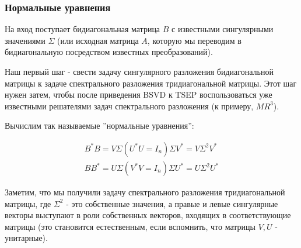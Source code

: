 

\subsubsection{Нормальные уравнения}
На вход поступает бидиагональная матрица $B$ с известными сингулярными значениями $\Sigma$ (или исходная матрица $A$, которую мы переводим в бидиагональную посредством известных преобразований).

Наш первый шаг - свести задачу сингулярного разложения бидиагональной матрицы к задаче спектрального разложения тридиагональной матрицы. Этот шаг нужен затем, чтобы после приведения BSVD к TSEP воспользоваться уже известными решателями задач спектрального разложения (к примеру, $MR^3$).

Вычислим так называемые ''нормальные уравнения'':

\begin{equation} \label{Norm_eq}
    \begin{split}
        B^*B=V \Sigma (U^*U=I_n) \Sigma V^*=V \Sigma^2 V^*\\
        BB^*=U\Sigma (V^* V=I_n) \Sigma U^*=U \Sigma^2 U^*
    \end{split}
\end{equation}

Заметим, что мы получили задачу спектрального разложения тридиагональной матрицы, где $\Sigma^2$ - это собственные значения, а правые и левые сингулярные векторы выступают в роли собственных векторов, входящих в соответствующие матрицы (это становится естественным, если вспомнить, что матрицы \(V,U\) - унитарные). 

